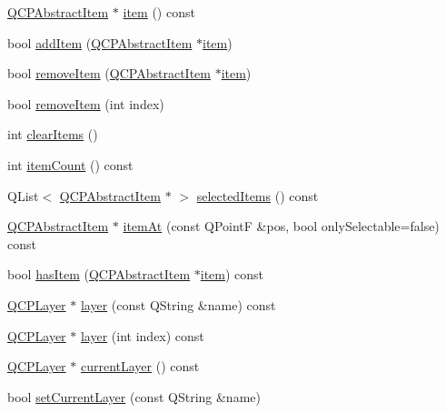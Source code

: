 \begin{DoxyCompactItemize}
\hyperlink{class_q_c_p_abstract_item}{Q\-C\-P\-Abstract\-Item} $\ast$ \hyperlink{class_q_custom_plot_a700399eae539798c5baf64a37c7f2135}{item} () const 
\item 
bool \hyperlink{class_q_custom_plot_aa500620379262321685cb7a7674cbd2a}{add\-Item} (\hyperlink{class_q_c_p_abstract_item}{Q\-C\-P\-Abstract\-Item} $\ast$\hyperlink{class_q_custom_plot_a3e842b5a65b1d17fbb96cfb1fa1314d1}{item})
\item 
bool \hyperlink{class_q_custom_plot_ae04446557292551e8fb6e2c106e1848d}{remove\-Item} (\hyperlink{class_q_c_p_abstract_item}{Q\-C\-P\-Abstract\-Item} $\ast$\hyperlink{class_q_custom_plot_a3e842b5a65b1d17fbb96cfb1fa1314d1}{item})
\item 
bool \hyperlink{class_q_custom_plot_abcfdda3d601c0441cab136137d715dea}{remove\-Item} (int index)
\item 
int \hyperlink{class_q_custom_plot_abdfd07d4f0591d0cf967f85013fd3645}{clear\-Items} ()
\item 
int \hyperlink{class_q_custom_plot_a6fc860e30df17fd5c46056bf6fe29390}{item\-Count} () const 
\item 
Q\-List$<$ \hyperlink{class_q_c_p_abstract_item}{Q\-C\-P\-Abstract\-Item} $\ast$ $>$ \hyperlink{class_q_custom_plot_a1a48b13547e2d9ac5cd6927516f47a2e}{selected\-Items} () const 
\item 
\hyperlink{class_q_c_p_abstract_item}{Q\-C\-P\-Abstract\-Item} $\ast$ \hyperlink{class_q_custom_plot_a793e4b04e0ede11a733021907368fa83}{item\-At} (const Q\-Point\-F \&pos, bool only\-Selectable=false) const 
\item 
bool \hyperlink{class_q_custom_plot_ab4199c38b03e63a2623c82453fe8add5}{has\-Item} (\hyperlink{class_q_c_p_abstract_item}{Q\-C\-P\-Abstract\-Item} $\ast$\hyperlink{class_q_custom_plot_a3e842b5a65b1d17fbb96cfb1fa1314d1}{item}) const 
\item 
\hyperlink{class_q_c_p_layer}{Q\-C\-P\-Layer} $\ast$ \hyperlink{class_q_custom_plot_aac492da01782820454e9136a8db28182}{layer} (const Q\-String \&name) const 
\item 
\hyperlink{class_q_c_p_layer}{Q\-C\-P\-Layer} $\ast$ \hyperlink{class_q_custom_plot_a1e73051e371f1815b48d8b355be0d2ab}{layer} (int index) const 
\item 
\hyperlink{class_q_c_p_layer}{Q\-C\-P\-Layer} $\ast$ \hyperlink{class_q_custom_plot_af73057345656cbd1463454982d808b00}{current\-Layer} () const 
\item 
bool \hyperlink{class_q_custom_plot_a73a6dc47c653bb6f8f030abca5a11852}{set\-Current\-Layer} (const Q\-String \&name)

\end{DoxyCompactItemize}
